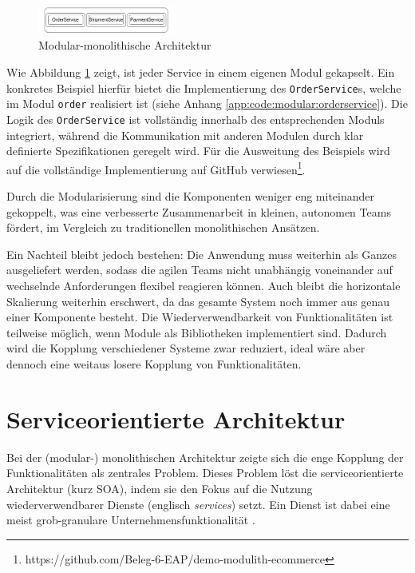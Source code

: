 \documentclass[acmtog]{acmart}
\begin{document}
\begin{figure}[h!]
  \centering
  \includegraphics[width=0.4\textwidth]{images/mono/mono-example.pdf}
  \caption{Modular-monolithische Architektur}
  \label{fig:modular-mono}
\end{figure}

Wie Abbildung \ref{fig:modular-mono} zeigt, ist jeder Service in einem eigenen Modul gekapselt.
Ein konkretes Beispiel hierfür bietet die Implementierung des \texttt{OrderService}s, welche im Modul \texttt{order}
realisiert ist (siehe Anhang \ref{app:code:modular:orderservice}). Die Logik des \texttt{OrderService} ist vollständig
innerhalb des entsprechenden Moduls integriert, während die Kommunikation mit anderen Modulen durch klar definierte
Spezifikationen geregelt wird.
Für die Ausweitung des Beispiels wird auf die vollständige Implementierung auf GitHub verwiesen\footnote{https://github.com/Beleg-6-EAP/demo-modulith-ecommerce}.

Durch die Modularisierung sind die Komponenten weniger eng miteinander gekoppelt, was eine
verbesserte Zusammenarbeit in kleinen, autonomen Teams fördert, im Vergleich zu traditionellen
monolithischen Ansätzen.

Ein Nachteil bleibt jedoch bestehen: Die Anwendung muss weiterhin als Ganzes ausgeliefert werden,
sodass die agilen Teams nicht unabhängig voneinander auf wechselnde Anforderungen flexibel reagieren können.
Auch bleibt die horizontale Skalierung weiterhin erschwert, da das gesamte System noch immer aus genau einer Komponente besteht.
Die Wiederverwendbarkeit von Funktionalitäten ist teilweise möglich, wenn Module als Bibliotheken implementiert sind.
Dadurch wird die Kopplung verschiedener Systeme zwar reduziert, ideal wäre aber dennoch eine weitaus losere Kopplung von Funktionalitäten.

\section{Serviceorientierte Architektur}
\label{sec:soa}
Bei der (modular-) monolithischen Architektur zeigte sich die enge Kopplung der Funktionalitäten als zentrales Problem.
Dieses Problem löst die serviceorientierte Architektur (kurz SOA), indem sie den Fokus auf die Nutzung wiederverwendbarer Dienste (englisch \textit{services}) setzt.
Ein Dienst ist dabei eine meist grob-granulare Unternehmensfunktionalität \cite[19]{soa4}.
\end{document}

